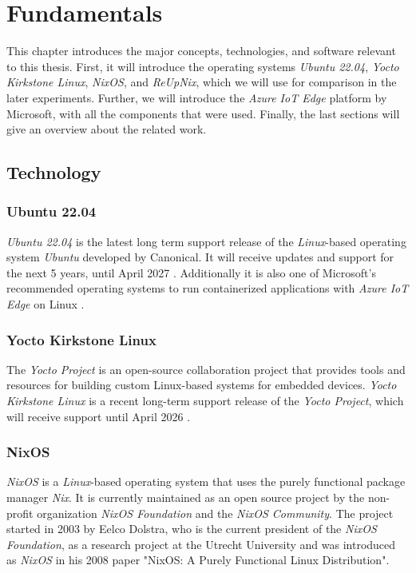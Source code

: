 \chapter{Fundamentals}
\label{sec:fundamentals}
This chapter introduces the major concepts, technologies,
and software relevant to this thesis. First, it will introduce the operating
systems \textit{Ubuntu 22.04}, \textit{Yocto Kirkstone Linux}, \textit{NixOS},
and \textit{ReUpNix}, which we will use for comparison in the later experiments.
Further, we will introduce the \textit{Azure IoT Edge} platform by Microsoft,
with all the components that were used.
Finally, the last sections will give an overview about the related work.

\section{Technology}
\subsection{Ubuntu 22.04}
\textit{Ubuntu 22.04} is the latest long term support release of the
\textit{Linux}-based operating system \textit{Ubuntu} developed by Canonical.
It will receive updates and support for the next 5 years, until April
2027 \cite{ubuntu-releasenote}. Additionally it is also one of Microsoft's
recommended operating systems to run containerized applications with
\textit{Azure IoT Edge} on Linux \cite{msdoc-supportetplatforms}.

\subsection{Yocto Kirkstone Linux}
The \textit{Yocto Project} is an open-source collaboration project that provides tools
and resources for building custom Linux-based systems for embedded devices.
\textit{Yocto Kirkstone Linux} is a recent long-term support release of the
\textit{Yocto Project}, which will receive support until April 2026 \cite{yocto-releases}.

\subsection{NixOS}
\textit{NixOS} is a \textit{Linux}-based operating system that uses the purely
functional package manager \textit{Nix}. It is currently maintained as
an open source project by the non-profit organization \textit{NixOS Foundation}
and the \textit{NixOS Community}. The project started in 2003 by Eelco Dolstra,
who is the current president of the \textit{NixOS Foundation}, as
a research project at the Utrecht University \cite{dolstra2003} and was introduced
as \textit{NixOS} in his 2008 paper "NixOS: A Purely Functional Linux Distribution".

